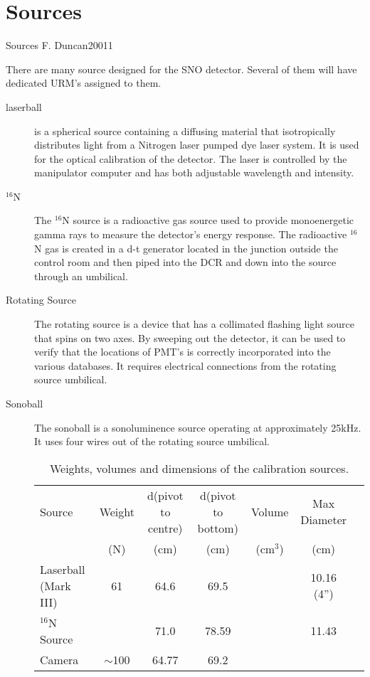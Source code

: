 \chapter{Sources}


       {Sources}
       {F. Duncan}{2001}{1}


  There are many source designed for the SNO detector.  Several of
them will have dedicated URM's assigned to them.
\begin{description}
\item[laserball] is a spherical source containing a diffusing material
  that isotropically distributes light from a Nitrogen laser pumped
  dye laser system.  It is used for the optical calibration of the detector.
  The laser is controlled by the manipulator computer and has both adjustable
  wavelength and intensity.

\item[$^{16}$N]
  The $^{16}$N source is a radioactive gas source used to provide 
monoenergetic gamma rays to measure the detector's energy response.  The
radioactive $^{16}$N gas is created in a d-t generator located in the
junction outside the control room and then piped into the DCR and down
into the source through an umbilical.
  
\item[Rotating Source]
  The rotating source is a device that has a collimated flashing light
source that spins on two axes.  By sweeping out the detector, it can
be used to verify that the locations of PMT's is correctly incorporated
into the various databases.  It requires electrical connections from
the rotating source umbilical.
  
\item[Sonoball]
  The sonoball is a sonoluminence source operating at 
approximately 25kHz.  It uses four wires out of the rotating source
umbilical.
  

\begin{table}
\begin{center}
\begin{tabular}{lcccccc} 
\hline
Source               &  Weight
   & d(pivot to centre) & d(pivot to bottom) & Volume & Max Diameter \\
   & (N)   & (cm)& (cm) & (cm$^{3}$) & (cm) \\
\hline
Laserball (Mark III) &  61  &  64.6 & 69.5  &   & 10.16 (4'') \\
\hline
$^{16}$N Source      &      &  71.0 & 78.59 &   & 11.43 \\
\hline
Camera               & $\sim$100  &  64.77 & 69.2 &   &  \\
\hline
\end{tabular}
\caption[Calibration Source Dimensions]
  {Weights, volumes and dimensions of the calibration sources.
  }
\end{center}
\end{table}




\end{description}
